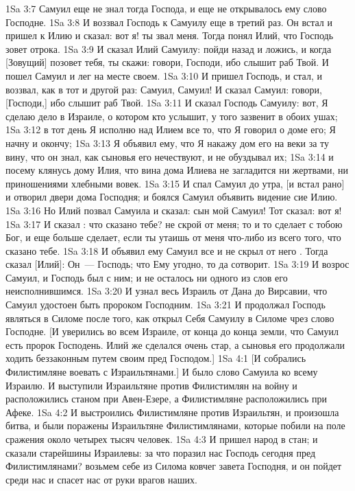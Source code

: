 \vs 1Sa 3:7 Самуил еще не знал тогда  Господа, и еще не открывалось ему слово Господне.
\vs 1Sa 3:8 И воззвал Господь к Самуилу еще в третий раз. Он встал и пришел к Илию и сказал: вот я! ты звал меня. Тогда понял Илий, что Господь зовет отрока.
\vs 1Sa 3:9 И сказал Илий Самуилу: пойди назад и ложись, и когда [Зовущий] позовет тебя, ты скажи: говори, Господи, ибо слышит раб Твой. И пошел Самуил и лег на месте своем.
\vs 1Sa 3:10 И пришел Господь, и стал, и воззвал, как в тот и другой раз: Самуил, Самуил! И сказал Самуил: говори, [Господи,] ибо слышит раб Твой.
\vs 1Sa 3:11 И сказал Господь Самуилу: вот, Я сделаю дело в Израиле, о котором кто услышит, у того зазвенит в обоих ушах;
\vs 1Sa 3:12 в тот день Я исполню над Илием все то, что Я говорил о доме его; Я начну и окончу;
\vs 1Sa 3:13 Я объявил ему, что Я накажу дом его на веки за ту вину, что он знал, как сыновья его нечествуют, и не обуздывал их;
\vs 1Sa 3:14 и посему клянусь дому Илия, что вина дома Илиева не загладится ни жертвами, ни приношениями хлебными вовек.
\vs 1Sa 3:15 И спал Самуил до утра, [и встал рано] и отворил двери дома Господня; и боялся Самуил объявить видение сие Илию.
\vs 1Sa 3:16 Но Илий позвал Самуила и сказал: сын мой Самуил! Тот сказал: вот я!
\vs 1Sa 3:17 И сказал : что сказано тебе? не скрой от меня; то и то сделает с тобою Бог, и еще больше сделает, если ты утаишь от меня что-либо из всего того, что сказано тебе.
\vs 1Sa 3:18 И объявил ему Самуил все и не скрыл от него . Тогда сказал [Илий]: Он~--- Господь; что Ему угодно, то да сотворит.
\rsbpar\vs 1Sa 3:19 И возрос Самуил, и Господь был с ним; и не осталось ни одного из слов его неисполнившимся.
\vs 1Sa 3:20 И узнал весь Израиль от Дана до Вирсавии, что Самуил удостоен быть пророком Господним.
\vs 1Sa 3:21 И продолжал Господь являться в Силоме после того, как открыл Себя Самуилу в Силоме чрез слово Господне. [И уверились во всем Израиле, от конца до конца земли, что Самуил есть пророк Господень. Илий же сделался очень стар, а сыновья его продолжали ходить беззаконным путем своим пред Господом.]
\vs 1Sa 4:1 [И собрались Филистимляне воевать с Израильтянами.] И было слово Самуила ко всему Израилю. И выступили Израильтяне против Филистимлян на войну и расположились станом при Авен-Езере, а Филистимляне расположились при Афеке.
\vs 1Sa 4:2 И выстроились Филистимляне против Израильтян, и произошла битва, и были поражены Израильтяне Филистимлянами, которые побили на поле сражения около четырех тысяч человек.
\vs 1Sa 4:3 И пришел народ в стан; и сказали старейшины Израилевы: за что поразил нас Господь сегодня пред Филистимлянами? возьмем себе из Силома ковчег завета Господня, и он пойдет среди нас и спасет нас от руки врагов наших.
